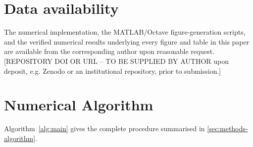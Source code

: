 \documentclass[preprint,12pt,a4paper]{elsarticle}
\theoremstyle{plain}
\theoremstyle{definition}
\theoremstyle{remark}
\begin{document}
\section*{Data availability}

The numerical implementation, the MATLAB/Octave figure-generation scripts, and
the verified numerical results underlying every figure and table in this
paper are available from the corresponding author upon reasonable request.
[REPOSITORY DOI OR URL -- TO BE SUPPLIED BY AUTHOR upon deposit, e.g. Zenodo
or an institutional repository, prior to submission.]

\appendix

\section{Numerical Algorithm}
\label{app:algorithm}

Algorithm~\ref{alg:main} gives the complete procedure summarised in
\cref{sec:methods-algorithm}.
\end{document}
